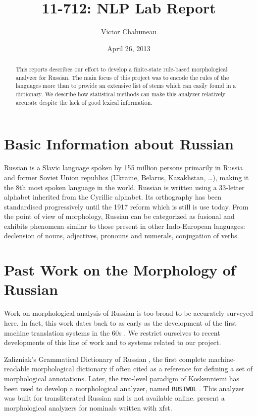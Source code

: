 \documentclass[11pt,letterpaper]{article}
\title{11-712:  NLP Lab Report}
\author{Victor Chahuneau}
\date{April 26, 2013}
\begin{document}
\maketitle
\begin{abstract}
This reports describes our effort to develop a finite-state rule-based morphological analyzer for Russian. The main focus of this project was to encode the rules of the languages more than to provide an extensive list of stems which can easily found in a dictionary. We describe how statistical methods can make this analyzer relatively accurate despite the lack of good lexical information.
\end{abstract}

\section{Basic Information about Russian}
Russian is a Slavic language spoken by 155 million persons primarily in Russia and former Soviet Union republics (Ukraine, Belarus, Kazakhstan, \ldots), making it the 8th most spoken language in the world. Russian is written using a 33-letter alphabet inherited from the Cyrillic alphabet. Its orthography has been standardised progressively until the 1917 reform which is still is use today. From the point of view of morphology, Russian can be categorized as fusional and exhibits phenomena similar to those present in other Indo-European languages: declension of nouns, adjectives, pronouns and numerals, conjugation of verbs.

\section{Past Work on the Morphology of Russian}

Work on morphological analysis of Russian is too broad to be accurately surveyed here. In fact, this work dates back to as early as the development of the first machine translation systems in the 60s \cite{nikolaeva}. We restrict ourselves to recent developments of this line of work and to systems related to our project.

Zalizniak's Grammatical Dictionary of Russian \cite{zalizniak}, the first complete machine-readable morphological dictionary if often cited as a reference for defining a set of morphological annotations. Later, the two-level paradigm of Koskenniemi has been used to develop a morphological analyzer, named \texttt{RUSTWOL} \cite{vilkki}. This analyzer was built for transliterated Russian and is not available online. \cite{bilan} present a morphological analyzers for nominals written with xfst.
\end{document}
